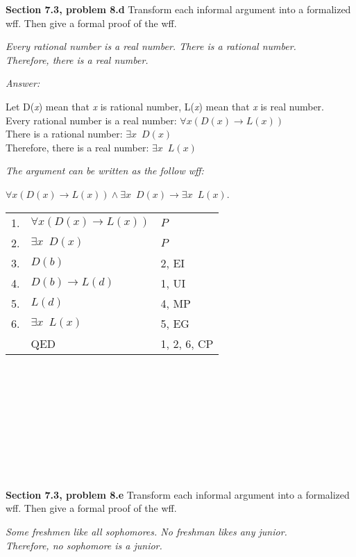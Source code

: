 \documentclass[12pt]{article}
\begin{document}
\textbf{Section 7.3, problem 8.d}  Transform each informal argument into a formalized wff. 
Then give a formal proof of the wff.

\emph{Every rational number is a real number. 
There is a rational number.\\ 
Therefore, there is a real number.}

\emph{Answer:} 

\begin{center}
Let D(\emph{x}) mean that \emph{x} is rational number, L(\emph{x}) mean that \emph{x} 
is real number. \\
Every rational number is a real number: $\forall x (D(x) \rightarrow L(x))$ \\
There is a rational number: $\exists x \enspace D(x)$ \\
Therefore, there is a real number: $\exists x \enspace L(x)$ \\
\end{center}

\emph{The argument can be written as the follow wff:} 

$\forall x (D(x) \rightarrow L(x)) \land \exists x \enspace D(x) 
\rightarrow \exists x \enspace L(x)$. 

\begin{tabular}{p{.8cm}p{8.5cm}l}
1. & $\forall x (D(x) \rightarrow L(x))$ & $P$ \\
2. & $\exists x \enspace D(x)$ & $P$ \\
3. & $D(b)$ & 2, EI \\
4. & $D(b) \rightarrow L(d)$ & 1, UI \\
5. & $L(d)$ & 4, MP \\
6. & $\exists x \enspace L(x)$ & 5, EG \\
& QED & 1, 2, 6, CP \\
\end{tabular}
\\
\\
\\
\\
\\
\\
\\
\\
\\
\textbf{Section 7.3, problem 8.e}  Transform each informal argument into a formalized wff. 
Then give a formal proof of the wff.

\emph{Some freshmen like all sophomores. 
No freshman likes any junior.\\
Therefore, no sophomore is a junior.}
\end{document}
